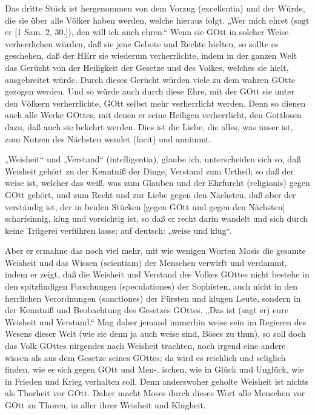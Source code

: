 Das dritte Stück ist hergenommen von dem Vorzug (excellentia) und der Würde, die sie über alle Völker haben werden, welche hieraus folgt. „Wer mich ehret (sagt er [1 Sam. 2, 30.]), den will ich auch ehren.“ Wenn sie GOtt in solcher Weise verherrlichen würden, daß sie jene Gebote und Rechte hielten, so sollte es geschehen, daß der HErr sie wiederum verherrlichte, indem in der ganzen Welt das Gerücht von der Heiligkeit der Gesetze und des Volkes, welches sie hielt, ausgebreitet würde. Durch dieses Gerücht würden viele zu dem wahren GOtte gezogen werden. Und so würde auch durch diese Ehre, mit der GOtt sie unter den Völkern verherrlichte, GOtt selbst mehr verherrlicht werden. Denn so dienen auch alle Werke GOttes, mit denen er seine Heiligen verherrlicht, den Gottlosen dazu, daß auch sie bekehrt werden. Dies ist die Liebe, die alles, was unser ist, zum Nutzen des Nächsten wendet (facit) und annimmt.

„Weisheit“ und „Verstand“ (intelligentia), glaube ich, unterscheiden sich so, daß Weisheit gehört zu der Kenntniß der Dinge, Verstand zum Urtheil; so daß der weise ist, welcher das weiß, was zum Glauben und der Ehrfurcht (religionis) gegen GOtt gehört, und zum Recht und zur Liebe gegen den Nächsten, daß aber der verständig ist, der in beiden Stücken [gegen GOtt und gegen den Nächsten] scharfsinnig, klug und vorsichtig ist, so daß er recht darin wandelt und sich durch keine Trügerei verführen lasse; auf deutsch: „weise und klug“.

Aber er ermahne das noch viel mehr, mit wie wenigen Worten Mosis die gesamte Weisheit und das Wissen (scientiam) der Menschen verwirft und verdammt, indem er zeigt, daß die Weisheit und Verstand des Volkes GOttes nicht bestehe in den spitzfindigen Forschungen (speculationes) der Sophisten, auch nicht in den herrlichen Verordnungen (sanctiones) der Fürsten und klugen Leute, sondern in der Kenntniß und Beobachtung des Gesetzes GOttes. „Das ist (sagt er) eure Weisheit und Verstand.“ Mag daher jemand immerhin weise sein im Regieren des Wesens dieser Welt (wie sie denn ja auch weise sind, Böses zu thun), so soll doch das Volk GOttes nirgendes nach Weisheit trachten, noch irgend eine andere wissen als aus dem Gesetze seines GOttes; da wird es reichlich und seliglich finden, wie es sich gegen GOtt und Men-.
ischen, wie in Glück und Unglück, wie in Frieden und Krieg verhalten soll. Denn anderswoher geholte Weisheit ist nichts als Thorheit vor GOtt. Daher macht Moses durch dieses Wort alle Menschen vor GOtt zu Thoren, in aller ihrer Weisheit und Klugheit.

